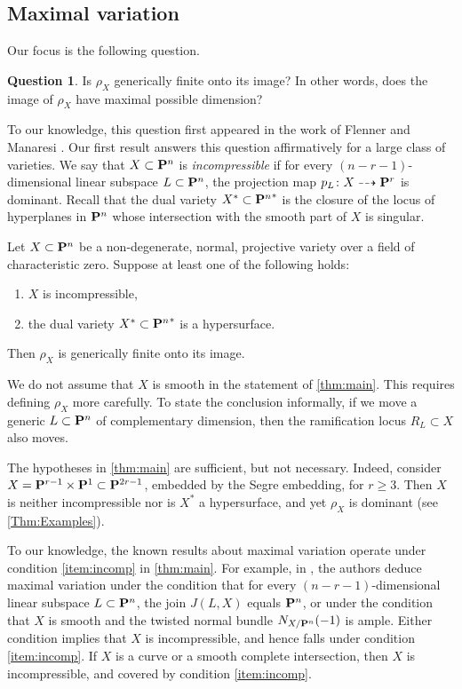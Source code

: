 \documentclass[11pt,reqno]{amsart}
\theoremstyle{plain}
\theoremstyle{definition}
\newtheorem{question}[theorem]{Question}
\theoremstyle{remark}
\numberwithin{equation}{section}
\numberwithin{equation}{section}
\begin{document}
\subsection{Maximal variation}
Our focus is the following question.
\begin{question}\label{q:maxvar}
  Is $\rho_{X}$ generically finite onto its image? In other words, does the image of $\rho_X$ have maximal possible dimension?
\end{question}

To our knowledge, this question first appeared in the work of Flenner and Manaresi \cite{MANAFlenn:}.
Our first result answers this question affirmatively for a large class of varieties.
We say that $X \subset \P^n$ is \emph{incompressible} if for every $(n-r-1)$-dimensional linear subspace $L \subset \P^n$, the projection map $p_L \from X \dashrightarrow \P^r$ is dominant.
Recall that the dual variety $X^* \subset {\P^n}^*$ is the closure of the locus of hyperplanes in $\P^n$ whose intersection with the smooth part of $X$ is singular.
\begin{maintheorem}\label{thm:main}
  Let $X \subset \P^n$ be a non-degenerate, normal, projective variety over a field of characteristic zero.
  Suppose at least one of the following holds:
  \begin{enumerate}
  \item\label{item:incomp} $X$ is incompressible, 
  \item\label{item:dual} the dual variety $X^* \subset {\P^n}^*$ is a hypersurface.
  \end{enumerate}
  Then $\rho_{X}$ is generically finite onto its image.
\end{maintheorem} 
We do not assume that $X$ is smooth in the statement of \autoref{thm:main}.
This requires defining $\rho_X$ more carefully.
To state the conclusion informally, if we move a generic $L \subset \P^n$ of complementary dimension, then the ramification locus $R_L \subset X$ also moves.

The hypotheses in \autoref{thm:main} are sufficient, but not necessary.
Indeed, consider $X = \P^{r-1} \times \P^1 \subset \P^{2r-1}$, embedded by the Segre embedding, for $r \geq 3$.
Then $X$ is neither incompressible nor is $X^*$ a hypersurface, and yet $\rho_X$ is dominant (see \autoref{Thm:Examples}).

To our knowledge, the known results about maximal variation operate under condition \eqref{item:incomp} in \autoref{thm:main}.
For example, in \cite{MANAFlenn:}, the authors deduce maximal variation under the condition that for every $(n-r-1)$-dimensional linear subspace $L \subset \P^n$, the join $J(L, X)$ equals $\P^n$, or under the condition that $X$ is smooth and the twisted normal bundle $N_{X/\P^n}(-1)$ is ample.
Either condition implies that $X$ is incompressible, and hence falls under condition \eqref{item:incomp}.
If $X$ is a curve or a smooth complete intersection, then $X$ is incompressible, and covered by condition \eqref{item:incomp}.
\end{document}
